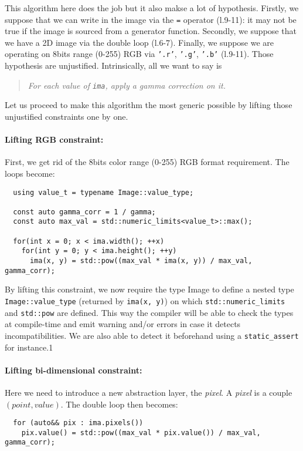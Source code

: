 \noindent This algorithm here does the job but it also makse a lot of hypothesis. Firstly, we suppose that we can write
in the image via the \texttt{=} operator (l.9-11): it may not be true if the image is sourced from a generator function.
Secondly, we suppose that we have a 2D image via the double loop (l.6-7). Finally, we suppose we are operating on 8bits
range (0-255) RGB via \texttt{'.r'}, \texttt{'.g'}, \texttt{'.b'} (l.9-11). Those hypothesis are unjustified.
Intrinsically, all we want to say is \blockquote{\emph{For each value of \texttt{ima}, apply a gamma correction on
    it.}}. Let us proceed to make this algorithm the most generic possible by lifting those unjustified constraints one by
one.



\paragraph{Lifting RGB constraint:}
First, we get rid of the 8bits color range (0-255) RGB format requirement. The loops become:

\begin{verbatim}
  using value_t = typename Image::value_type;

  const auto gamma_corr = 1 / gamma;
  const auto max_val = std::numeric_limits<value_t>::max();

  for(int x = 0; x < ima.width(); ++x)
    for(int y = 0; y < ima.height(); ++y)
      ima(x, y) = std::pow((max_val * ima(x, y)) / max_val, gamma_corr);
\end{verbatim}

\noindent By lifting this constraint, we now require the type Image to define a nested type \texttt{Image::value\_type}
(returned by \texttt{ima(x, y)}) on which \texttt{std::numeric\_limits} and \texttt{std::pow} are defined. This way the
compiler will be able to check the types at compile-time and emit warning and/or errors in case it detects
incompatibilities. We are also able to detect it beforehand using a \texttt{static\_assert} for instance.1



\paragraph{Lifting bi-dimensional constraint:}
Here we need to introduce a new abstraction layer, the \emph{pixel}. A \emph{pixel} is a couple $(point, value)$. The
double loop then becomes:

\begin{verbatim}
  for (auto&& pix : ima.pixels())
    pix.value() = std::pow((max_val * pix.value()) / max_val, gamma_corr);
\end{verbatim}


